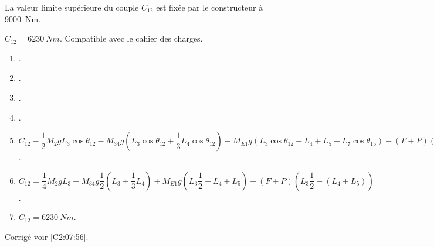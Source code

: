 La valeur limite supérieure du couple $C_{12}$ est fixée par le constructeur à \SI{9000}{Nm}.

\ifprof
 $C_{12} = \SI{6230}{Nm}$. Compatible avec le cahier des charges. 
\else
\fi







\ifprof
\else
\ifcolle
\else
\footnotesize
\begin{enumerate}
\item .
\item .
\item .
\item .
\item $
C_{12} -\dfrac{1}{2}M_2gL_3 \cos \theta_{12}
  -M_{34}g\left( L_3\cos\theta_{12} +\dfrac{1}{3}L_4\cos\theta_{12}\right)
  -M_{E1}g\left( L_3 \cos\theta_{12}+L_4+L_5+L_7 \cos\theta_{15}\right) 
  -(F+P)\left(  L_3 \sin\left(\theta_{15}-\theta_{12} \right)+ \left(L_4+L_5\right)\sin\left(\theta_{15} \right)-l_5 \cos\left(\theta_{15}  \right)  \right) 
  = 0
$.
\item $
C_{12} 
= \dfrac{1}{4}M_2gL_3 
  +M_{34}g\dfrac{1}{2}\left( L_3 +\dfrac{1}{3}L_4\right)
  +M_{E1}g\left( L_3 \dfrac{1}{2}+L_4+L_5 \right) 
  +(F+P)\left(  L_3 \dfrac{1}{2}- \left(L_4+L_5\right)  \right) 
$.
\item $C_{12} = \SI{6230}{Nm}$.
\end{enumerate}
\normalsize
\fi


\begin{flushright}
\footnotesize{Corrigé  voir \ref{C2:07:56}.}
\end{flushright}%
\fi 